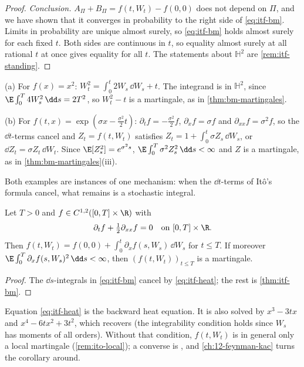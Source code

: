 \begin{proof}
\emph{Conclusion.} $A_\Pi+B_\Pi=f(t,W_t)-f(0,0)$ does not depend on $\Pi$, and we have shown that
it converges in probability to the right side of \eqref{eq:itf-bm}. Limits in probability are
unique almost surely, so \eqref{eq:itf-bm} holds almost surely for each fixed $t$. Both sides
are continuous in $t$, so equality almost surely at all rational $t$ at once gives equality for all
$t$. The statements about $\mathbb H^2$ are \cref{rem:itf-standing}.
\end{proof}

\begin{example}\label{exa:itf-bm}
(a) For $f(x)=x^2$: $W_t^2=\int_0^t2W_s\,\dd W_s+t$. The integrand is in $\mathbb H^2$, since
$\E\int_0^T4W_s^2\,\dd s=2T^2$, so $W_t^2-t$ is a martingale, as in \cref{thm:bm-martingales}.

(b) For $f(t,x)=\exp(\sigma x-\frac{\sigma^2}2t)$: $\partial_tf=-\frac{\sigma^2}2f$,
$\partial_xf=\sigma f$ and $\partial_{xx}f=\sigma^2f$, so the $\dd t$-terms cancel and
$Z_t=f(t,W_t)$ satisfies $Z_t=1+\int_0^t\sigma Z_s\,\dd W_s$, or $\dd Z_t=\sigma Z_t\,\dd W_t$.
Since $\E[Z_s^2]=e^{\sigma^2s}$, $\E\int_0^T\sigma^2Z_s^2\,\dd s<\infty$ and $Z$ is a martingale,
as in \cref{thm:bm-martingales}(iii).
\end{example}

Both examples are instances of one mechanism: when the $\dd t$-terms of It\^o's formula cancel,
what remains is a stochastic integral.

\begin{corollary}\label{cor:itf-martingale}
Let $T>0$ and $f\in C^{1,2}([0,T]\times\R)$ with
\begin{equation}\label{eq:itf-heat}
  \partial_tf+\tfrac12\partial_{xx}f=0\quad\text{on }[0,T]\times\R .
\end{equation}
Then $f(t,W_t)=f(0,0)+\int_0^t\partial_xf(s,W_s)\,\dd W_s$ for $t\le T$. If moreover
$\E\int_0^T\partial_xf(s,W_s)^2\,\dd s<\infty$, then $(f(t,W_t))_{t\le T}$ is a martingale.
\end{corollary}

\begin{proof}
The $\dd s$-integrals in \eqref{eq:itf-bm} cancel by \eqref{eq:itf-heat}; the rest is
\cref{thm:itf-bm}.
\end{proof}

Equation \eqref{eq:itf-heat} is the backward heat equation. It is also solved by $x^3-3tx$ and
$x^4-6tx^2+3t^2$, which recovers  (the integrability condition holds since
$W_s$ has moments of all orders). Without that condition, $f(t,W_t)$ is in general only a local
martingale (\cref{rem:ito-local}); a converse is , and
\cref{ch:12-feynman-kac} turns the corollary around.

